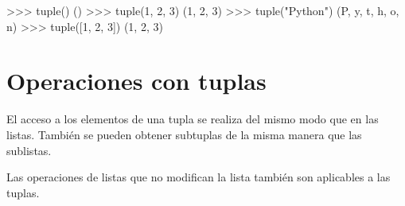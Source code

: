 \documentclass[
  spanish,
  a4paper,
]{scrreport}
\newenvironment{Shaded}{\begin{snugshade}}{\end{snugshade}}
\newcommand{\BuiltInTok}[1]{\textcolor[rgb]{0.00,0.23,0.31}{#1}}
\newcommand{\DecValTok}[1]{\textcolor[rgb]{0.68,0.00,0.00}{#1}}
\newcommand{\NormalTok}[1]{\textcolor[rgb]{0.00,0.23,0.31}{#1}}
\newcommand{\OperatorTok}[1]{\textcolor[rgb]{0.37,0.37,0.37}{#1}}
\newcommand{\StringTok}[1]{\textcolor[rgb]{0.13,0.47,0.30}{#1}}
\begin{document}
\begin{Shaded}
\begin{Highlighting}[]
\OperatorTok{\textgreater{}\textgreater{}\textgreater{}} \BuiltInTok{tuple}\NormalTok{()}
\NormalTok{()}
\OperatorTok{\textgreater{}\textgreater{}\textgreater{}} \BuiltInTok{tuple}\NormalTok{(}\DecValTok{1}\NormalTok{, }\DecValTok{2}\NormalTok{, }\DecValTok{3}\NormalTok{)}
\NormalTok{(}\DecValTok{1}\NormalTok{, }\DecValTok{2}\NormalTok{, }\DecValTok{3}\NormalTok{)}
\OperatorTok{\textgreater{}\textgreater{}\textgreater{}} \BuiltInTok{tuple}\NormalTok{(}\StringTok{"Python"}\NormalTok{)}
\NormalTok{(}\StringTok{\textquotesingle{}P\textquotesingle{}}\NormalTok{, }\StringTok{\textquotesingle{}y\textquotesingle{}}\NormalTok{, }\StringTok{\textquotesingle{}t\textquotesingle{}}\NormalTok{, }\StringTok{\textquotesingle{}h\textquotesingle{}}\NormalTok{, }\StringTok{\textquotesingle{}o\textquotesingle{}}\NormalTok{, }\StringTok{\textquotesingle{}n\textquotesingle{}}\NormalTok{)}
\OperatorTok{\textgreater{}\textgreater{}\textgreater{}} \BuiltInTok{tuple}\NormalTok{([}\DecValTok{1}\NormalTok{, }\DecValTok{2}\NormalTok{, }\DecValTok{3}\NormalTok{])}
\NormalTok{(}\DecValTok{1}\NormalTok{, }\DecValTok{2}\NormalTok{, }\DecValTok{3}\NormalTok{)}
\end{Highlighting}
\end{Shaded}

\section{Operaciones con tuplas}\label{operaciones-con-tuplas}

El acceso a los elementos de una tupla se realiza del mismo modo que en
las listas. También se pueden obtener subtuplas de la misma manera que
las sublistas.

Las operaciones de listas que no modifican la lista también son
aplicables a las tuplas.
\end{document}
